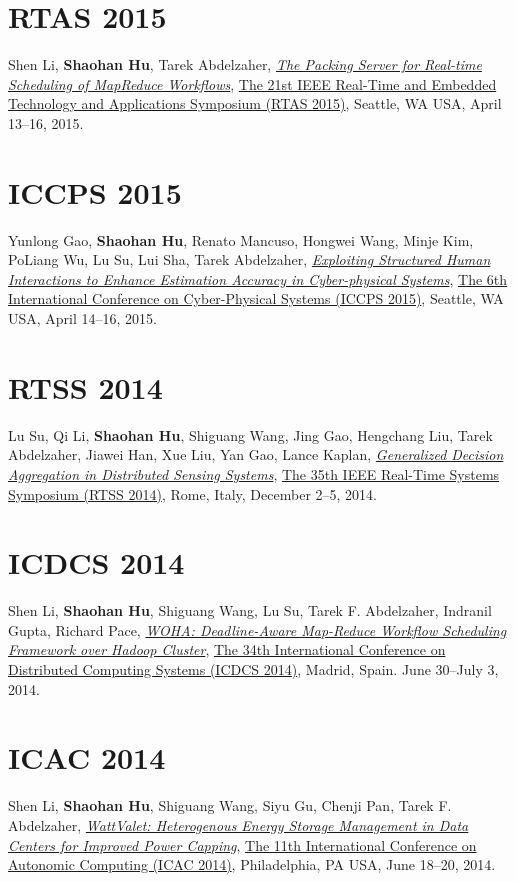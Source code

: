 \section{\sc RTAS 2015}\hypertarget{li2015rtas}{}
Shen Li, \textbf{Shaohan Hu}, Tarek Abdelzaher,
\href{http://ieeexplore.ieee.org/document/7108416}{\emph{The Packing Server for Real-time Scheduling of MapReduce Workflows}},
\href{http://2015.rtas.org/}{\textsf{The 21st IEEE Real-Time and Embedded Technology and Applications Symposium (RTAS 2015)}},
Seattle, WA USA, April 13--16, 2015.

\section{\sc ICCPS 2015}\hypertarget{gao2015iccps}{}
Yunlong Gao, \textbf{Shaohan Hu}, Renato Mancuso, Hongwei Wang, Minje Kim, PoLiang Wu, Lu Su, Lui Sha, Tarek Abdelzaher,
\href{http://dl.acm.org/citation.cfm?id=2735960.2735965}{\emph{Exploiting Structured Human Interactions to Enhance Estimation Accuracy in Cyber-physical Systems}},
\href{http://iccps.acm.org/2015/}{\textsf{The 6th International Conference on Cyber-Physical Systems (ICCPS 2015)}},
Seattle, WA USA, April 14--16, 2015.

\section{\sc RTSS 2014}\hypertarget{su2014rtss}{}
Lu Su, Qi Li, \textbf{Shaohan Hu}, Shiguang Wang, Jing Gao, Hengchang Liu, Tarek Abdelzaher, Jiawei Han, Xue Liu, Yan Gao, Lance Kaplan,
\href{http://ieeexplore.ieee.org/document/7010369}{\emph{Generalized Decision Aggregation in Distributed Sensing Systems}},
\href{http://2014.rtss.org/}{\textsf{The 35th IEEE Real-Time Systems Symposium (RTSS 2014)}},
Rome, Italy, December 2--5, 2014.

\section{\sc ICDCS 2014}\hypertarget{li2014icdcs}{}
Shen Li, \textbf{Shaohan Hu}, Shiguang Wang, Lu Su, Tarek F. Abdelzaher, Indranil Gupta, Richard Pace,
\href{http://ieeexplore.ieee.org/document/6888886}{\emph{WOHA: Deadline-Aware Map-Reduce Workflow Scheduling Framework over Hadoop Cluster}},
\href{http://lsd.ls.fi.upm.es/icdcs2014}{\textsf{The 34th International Conference on Distributed Computing Systems (ICDCS 2014)}},
Madrid, Spain. June 30--July 3, 2014.

\section{\sc ICAC 2014}\hypertarget{li2014icac}{}
Shen Li, \textbf{Shaohan Hu}, Shiguang Wang, Siyu Gu, Chenji Pan, Tarek F. Abdelzaher,
\href{https://www.usenix.org/system/files/conference/icac14/icac14-paper-li_shen.pdf}{\emph{WattValet: Heterogenous Energy Storage Management in Data Centers for Improved Power Capping}},
\href{https://www.usenix.org/conference/icac14}{\textsf{The 11th International Conference on Autonomic Computing (ICAC 2014)}},
Philadelphia, PA USA, June 18--20, 2014.

